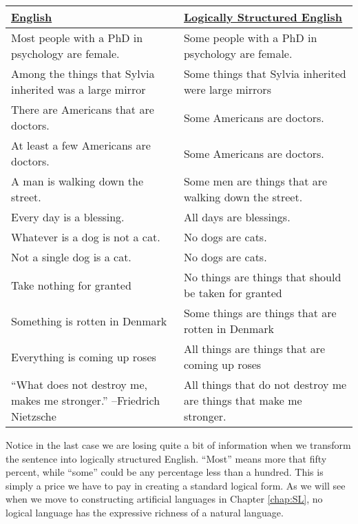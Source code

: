 \begin{fullwidth}
\begin{longtabu}{p{.5\linewidth}p{.5\linewidth}}
\underline{English} &
\underline{Logically Structured English} \\
\endhead

Most people with a PhD in psychology are female. &
Some people with a PhD in psychology are female. \\

Among the things that Sylvia inherited was a large mirror &
Some things that Sylvia inherited were large mirrors\\

There are Americans that are doctors. &
Some Americans are doctors. \\

At least a few Americans are doctors.&
Some Americans are doctors. \\

A man is walking down the street. &
Some men are things that are walking down the street.\\


Every day is a blessing. &
All days are blessings. \\

Whatever is a dog is not a cat. &
No dogs are cats. \\

Not a single dog is a cat. &
No dogs are cats. \\

Take nothing for granted &
No things are things that should be taken for granted \\

Something is rotten in Denmark &
Some things are things that are rotten in Denmark\\

Everything is coming up roses &
All things are things that are coming up roses\\


``What does not destroy me, makes me stronger.'' --Friedrich Nietzsche &
All things that do not destroy me are things that make me stronger. \\


\end{longtabu}
\end{fullwidth}

Notice in the last case we are losing quite a bit of information when we transform the sentence into logically structured English. ``Most'' means more that fifty percent, while ``some'' could be any percentage less than a hundred. This is simply a price we have to pay in creating a standard logical form. As we will see when we move to constructing artificial languages in Chapter \ref{chap:SL}, no logical language has the expressive richness of a natural language.

